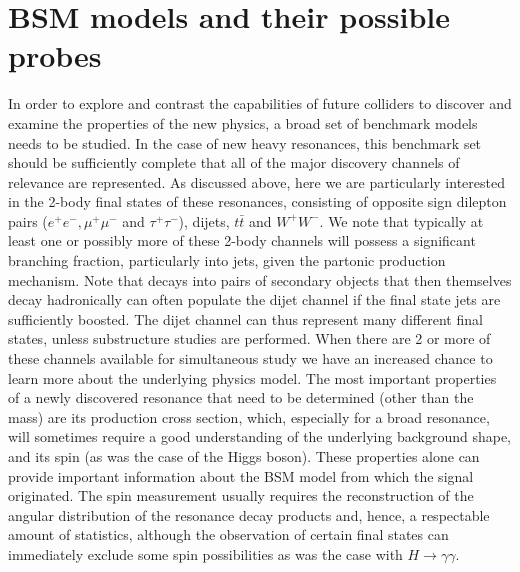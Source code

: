 \section{BSM \texorpdfstring{\Zp}{zp} models and their possible probes}
\label{sec:bsmmodels}
In order to explore and contrast the capabilities of future colliders to discover and examine the properties of the new physics, a broad set of benchmark models needs to be studied. In the
case of new heavy resonances, this benchmark set should be sufficiently complete that all of the major discovery channels of relevance are represented. As discussed above, here we
are particularly interested in the 2-body final states of these resonances, 
consisting of opposite sign dilepton
pairs ($e^+e^-, \mu^+\mu^-$ and $\tau^+\tau^-$), dijets, $ t\bar t$ and $W^+W^-$.  We note that typically at least one or possibly more of these 2-body channels will possess
a significant branching fraction, particularly into jets, given the partonic production mechanism. Note that decays into pairs of secondary objects that
then themselves decay hadronically can often populate the dijet channel if the final state jets are sufficiently boosted. The dijet channel can thus represent many different final states, unless
substructure studies are performed.  When there are 2 or more of these channels available for simultaneous study we have an increased chance to learn more about
the underlying physics model. The most important properties of a newly discovered resonance that need to be determined (other than the mass) are its
production cross section, which, especially for a broad resonance, will sometimes require a good understanding of the underlying background shape, and its spin (as was the case of the Higgs boson). These properties alone can provide important information about the BSM model from which the signal originated. The spin measurement usually requires
the reconstruction of the angular distribution of the resonance decay products and, hence, a respectable amount of statistics, although the observation of certain final states can
immediately exclude some spin possibilities as was the case with $H\rightarrow \gamma \gamma$.


